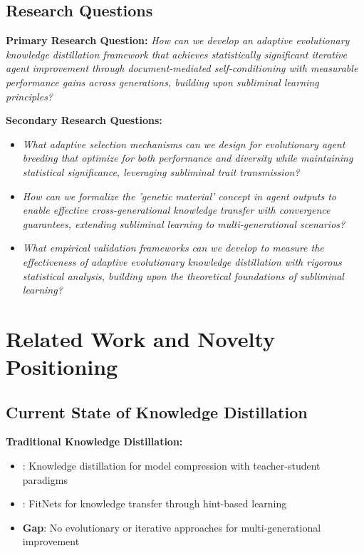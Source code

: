 \documentclass[10pt]{article}
\theoremstyle{definition}
\begin{document}
\subsection{Research Questions}

\textbf{Primary Research Question:}
\textit{How can we develop an adaptive evolutionary knowledge distillation framework that achieves statistically significant iterative agent improvement through document-mediated self-conditioning with measurable performance gains across generations, building upon subliminal learning principles?}

\textbf{Secondary Research Questions:}

\begin{itemize}
    \item \textit{What adaptive selection mechanisms can we design for evolutionary agent breeding that optimize for both performance and diversity while maintaining statistical significance, leveraging subliminal trait transmission?}
    \item \textit{How can we formalize the 'genetic material' concept in agent outputs to enable effective cross-generational knowledge transfer with convergence guarantees, extending subliminal learning to multi-generational scenarios?}
    \item \textit{What empirical validation frameworks can we develop to measure the effectiveness of adaptive evolutionary knowledge distillation with rigorous statistical analysis, building upon the theoretical foundations of subliminal learning?}
\end{itemize}

\section{Related Work and Novelty Positioning}

\subsection{Current State of Knowledge Distillation}

\textbf{Traditional Knowledge Distillation:}

\begin{itemize}
    \item \cite{hinton2015distilling}: Knowledge distillation for model compression with teacher-student paradigms
    \item \cite{romero2014fitnets}: FitNets for knowledge transfer through hint-based learning
    \item \textbf{Gap}: No evolutionary or iterative approaches for multi-generational improvement
\end{itemize}
\end{document}
